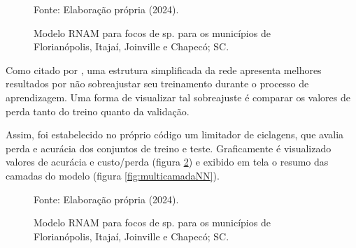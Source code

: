 \begin{figure}[htbp]
    \begin{center}
    \caption{Modelo \acrshort{RNAM} para focos de  sp. para os municípios de Florianópolis, Itajaí, Joinville e Chapecó; \acrlong{SC}.}
    \label{fig:modeloNN}
    \hfill
    \hfill
    \end{center}
    \small{Fonte: Elaboração própria (2024).}
\end{figure}

\indent Como citado por , uma estrutura simplificada da rede apresenta melhores resultados por não sobreajustar seu treinamento durante o processo de aprendizagem. Uma forma de visualizar tal sobreajuste é comparar os valores de perda tanto do treino quanto da validação.

\indent Assim, foi estabelecido no próprio código um limitador de ciclagens, que avalia perda e acurácia dos conjuntos de treino e teste. Graficamente é visualizado valores de acurácia e custo/perda (figura \ref{fig:validamodeloNN}) e exibido em tela o resumo das camadas do modelo (figura \ref{fig:multicamadaNN}).

\begin{figure}[htbp]
    \begin{center}
    \caption{Modelo \acrshort{RNAM} para focos de  sp. para os municípios de Florianópolis, Itajaí, Joinville e Chapecó; \acrlong{SC}.}
    \label{fig:validamodeloNN}
    \hfill
    \hfill
    \end{center}
    \small{Fonte: Elaboração própria (2024).}
\end{figure}

